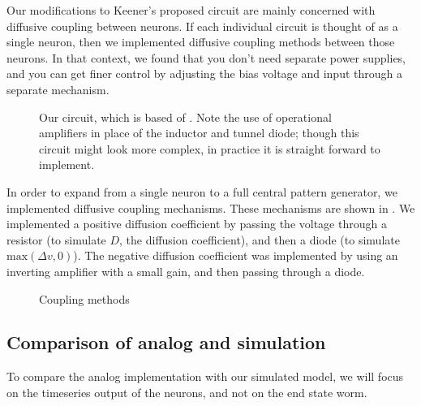 \documentclass[
    11pt,
]{article}
\begin{document}
Our modifications to Keener's proposed circuit are mainly concerned with diffusive coupling between neurons. If each individual circuit is thought of as a single neuron, then we implemented diffusive coupling methods between those neurons.  In that context, we found that you don't need separate power supplies, and you can get finer control by adjusting the bias voltage and input through a separate mechanism.

\begin{figure}[h!]
    \centering
    \caption{Our circuit, which is based of \citet{keener1983}.  Note the use of operational amplifiers in place of the inductor and tunnel diode; though this circuit might look more complex, in practice it is straight forward to implement.}
    \label{fig: neuron_unit}
\end{figure}

 In order to expand from a single neuron to a full central pattern generator, we implemented diffusive coupling mechanisms.  These mechanisms are shown in .  We implemented a positive diffusion coefficient by passing the voltage through a resistor (to simulate $D$, the diffusion coefficient), and then a diode (to simulate $\mathrm{max}(\Delta v, 0)$).  The negative diffusion coefficient was implemented by using an inverting amplifier with a small gain, and then passing through a diode.
\newsavebox{\tempbox}
\begin{figure}
    \centering
    \caption{Coupling methods}
    \label{fig: coupling}
\end{figure}

\subsection{Comparison of analog and simulation}

To compare the analog implementation with our simulated model, we will focus on the timeseries output of the neurons, and not on the end state worm.
\end{document}
